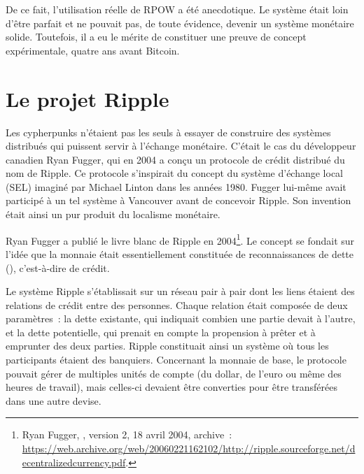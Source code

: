 De ce fait, l'utilisation réelle de RPOW a été anecdotique. Le système était loin d'être parfait et ne pouvait pas, de toute évidence, devenir un système monétaire solide. Toutefois, il a eu le mérite de constituer une preuve de concept expérimentale, quatre ans avant Bitcoin. %

\section*{Le projet Ripple} %

Les cypherpunks n'étaient pas les seuls à essayer de construire des systèmes distribués qui puissent servir à l'échange monétaire. C'était le cas du développeur canadien Ryan Fugger, qui en 2004 a conçu un protocole de crédit distribué du nom de Ripple. Ce protocole s'inspirait du concept du système d'échange local (SEL) imaginé par Michael Linton dans les années 1980. Fugger lui-même avait participé à un tel système à Vancouver avant de concevoir Ripple. Son invention était ainsi un pur produit du localisme monétaire. %

Ryan Fugger a publié le livre blanc de Ripple en 2004\footnote{Ryan Fugger, , version 2, 18 avril 2004, archive~: \url{https://web.archive.org/web/20060221162102/http://ripple.sourceforge.net/decentralizedcurrency.pdf}.}. Le concept se fondait sur l'idée que la monnaie était essentiellement constituée de reconnaissances de dette (), c'est-à-dire de crédit.

Le système Ripple s'établissait sur un réseau pair à pair dont les liens étaient des relations de crédit entre des personnes. Chaque relation était composée de deux paramètres~: la dette existante, qui indiquait combien une partie devait à l'autre, et la dette potentielle, qui prenait en compte la propension à prêter et à emprunter des deux parties. Ripple constituait ainsi un système où tous les participants étaient des banquiers. Concernant la monnaie de base, le protocole pouvait gérer de multiples unités de compte (du dollar, de l'euro ou même des heures de travail), mais celles-ci devaient être converties pour être transférées dans une autre devise.

